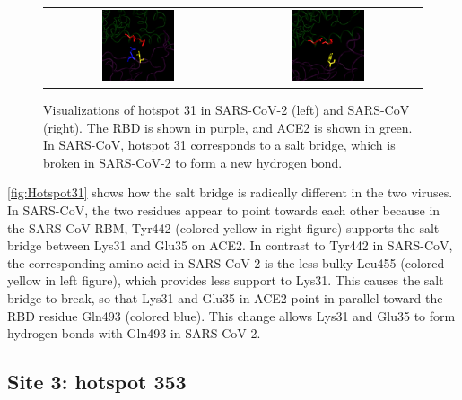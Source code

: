 \begin{figure}[h]
	\centering
	\mySfFamily
	\begin{tabular}{c c}
	\includegraphics[width = 0.4\textwidth]{../images/Hotspot31_SARS-2.png} & \includegraphics[width = 0.4\textwidth]{../images/Hotspot31_SARS.png}
	\end{tabular}
	\caption{Visualizations of hotspot 31 in SARS-CoV-2 (left) and SARS-CoV (right). The RBD is shown in purple, and ACE2 is shown in green. In SARS-CoV, hotspot 31 corresponds to a salt bridge, which is broken in SARS-CoV-2 to form a new hydrogen bond.}
	\label{fig:Hotspot31}
\end{figure}

\autoref{fig:Hotspot31} shows how the salt bridge is radically different in the two viruses. In SARS-CoV, the two residues appear to point towards each other because in the SARS-CoV RBM, Tyr442 (colored yellow in right figure) supports the salt bridge between Lys31 and Glu35 on ACE2. In contrast to Tyr442 in SARS-CoV, the corresponding amino acid in SARS-CoV-2 is the less bulky Leu455 (colored yellow in left figure), which provides less support to Lys31. This causes the salt bridge to break, so that Lys31 and Glu35 in ACE2 point in parallel toward the RBD residue Gln493 (colored blue). This change allows Lys31 and Glu35 to form hydrogen bonds with Gln493 in SARS-CoV-2.

\FloatBarrier
{}
\subsection{Site 3: hotspot 353}

